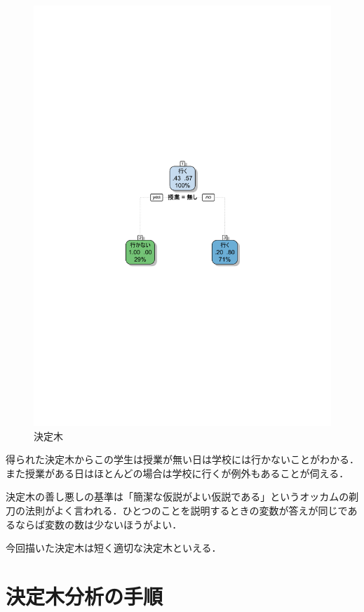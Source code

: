 \begin{figure}[H]
\centering
\includegraphics[width=13cm]{figure46.pdf}
\caption{決定木}\label{sannp}
\end{figure}

得られた決定木からこの学生は授業が無い日は学校には行かないことがわかる．また授業がある日はほとんどの場合は学校に行くが例外もあることが伺える．

決定木の善し悪しの基準は「簡潔な仮説がよい仮説である」というオッカムの剃刀の法則がよく言われる．ひとつのことを説明するときの変数が答えが同じであるならば変数の数は少ないほうがよい．

今回描いた決定木は短く適切な決定木といえる．



\section{決定木分析の手順}


